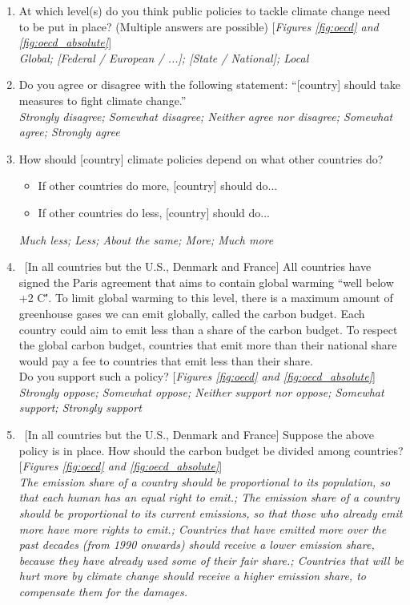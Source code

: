 \begin{enumerate} \item \label{q:scale} At which level(s) do you think public policies to tackle climate change need to be put in place? (Multiple answers are possible) [\textit{Figures \ref{fig:oecd} and \ref{fig:oecd_absolute}}]
\\ \textit{Global; [Federal / European / ...]; [State / National]; Local}
\item Do you agree or disagree with the following statement: ``[country] should take measures to fight climate change.''%
	\\ \textit{Strongly disagree; Somewhat disagree; Neither agree nor disagree; Somewhat agree; Strongly agree}
\item How should [country] climate policies depend on what other countries do?%
 \begin{itemize}
\item If other countries do more, [country] should do...
\item If other countries do less, [country] should do...
\end{itemize}
\textit{Much less; Less; About the same; More; Much more}
\item ~[In all countries but the U.S., Denmark and France]  All countries have signed the Paris agreement that aims to contain global warming ``well below +2 \textdegree{}C\''. To limit global warming to this level, there is a maximum amount of greenhouse gases we can emit globally, called the carbon budget. Each country could aim to emit less than a share of the carbon budget. To respect the global carbon budget, countries that emit more than their national share would pay a fee to countries that emit less than their share. \\ 
Do you support such a policy? [\textit{Figures \ref{fig:oecd} and \ref{fig:oecd_absolute}}] 
\\ \textit{Strongly oppose; Somewhat oppose; Neither support nor oppose; Somewhat support; Strongly support}
\item ~[In all countries but the U.S., Denmark and France] Suppose the above policy is in place. How should the carbon budget be divided among countries? [\textit{Figures \ref{fig:oecd} and \ref{fig:oecd_absolute}}]
\\ \textit{The emission share of a country should be proportional to its population, so that each human has an equal right to emit.; The emission share of a country should be proportional to its current emissions, so that those who already emit more have more rights to emit.; Countries that have emitted more over the past decades (from 1990 onwards) should receive a lower emission share, because they have already used some of their fair share.; Countries that will be hurt more by climate change should receive a higher emission share, to compensate them for the damages.}

\end{enumerate}
